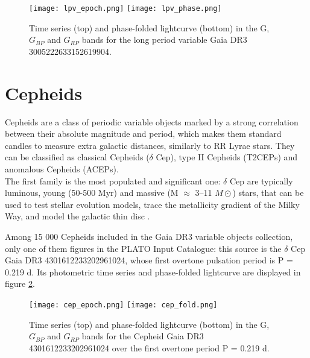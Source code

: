 \begin{figure}[H]
\centering
\texttt{[image: lpv\_epoch.png]}
\texttt{[image: lpv\_phase.png]}
\caption{Time series (top) and phase-folded lightcurve (bottom) in the G, $G_{BP}$ and $G_{RP}$ bands for the long period variable Gaia DR3 3005222633152619904. }
\label{fig:lpv}
\end{figure}





\newpage

\section{Cepheids}

Cepheids are a class of periodic variable objects marked by a strong correlation between their absolute magnitude and period, which makes them standard candles to measure extra galactic distances, similarly to RR Lyrae stars.
They can be classified as classical Cepheids ($\delta$ Cep), type II Cepheids (T2CEPs) and anomalous Cepheids (ACEPs).\\
The first family is the most populated and significant one: $\delta$ Cep are typically luminous, young (50-500 Myr) and massive (M $\approx$ 3–11 $M\odot$) stars, that can be used to test stellar evolution models, trace the metallicity gradient of the Milky Way, and model the galactic thin disc \parencite{ripepi}.

Among 15 000 Cepheids included in the Gaia DR3 variable objects collection, only one of them figures in the PLATO Input Catalogue: this source is the $\delta$ Cep Gaia DR3 4301612233202961024, whose first overtone pulsation period is P = 0.219 d.
Its photometric time series and phase-folded lightcurve are displayed in figure \ref{fig:cep}.

\begin{figure}[H]
\centering
\texttt{[image: cep\_epoch.png]}
\texttt{[image: cep\_fold.png]}
\caption{Time series (top) and phase-folded lightcurve (bottom) in the G, $G_{BP}$ and $G_{RP}$ bands for the Cepheid Gaia DR3 4301612233202961024 over the first overtone period P = 0.219 d.}
\label{fig:cep}
\end{figure}


